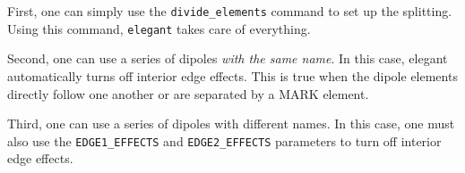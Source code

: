 First, one can simply use the \verb|divide_elements| command to set up
the splitting.  Using this command, {\tt elegant} takes care of everything.

Second, one can use a series of dipoles {\em with the same name}.  In this case,
elegant automatically turns off interior edge effects.  This is true when the
dipole elements directly follow one another or are separated by a MARK element.

Third, one can use a series of dipoles with different names.  In this case, one
must also use the \verb|EDGE1_EFFECTS| and \verb|EDGE2_EFFECTS| parameters to
turn off interior edge effects.  

